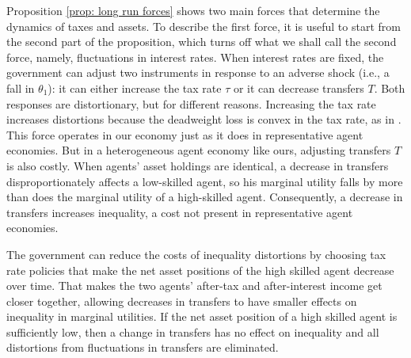 \documentclass[thmsb,11pt]{article}
\begin{document}
Proposition \ref{prop: long run forces}  shows  two main forces that determine the dynamics of taxes
and assets. To describe the first force, it is useful to start  from the second part
of the proposition, which turns off what we shall call the second force,  namely, fluctuations in
interest rates. When  interest rates are fixed, the government can adjust two
instruments in response  to an adverse  shock (i.e., a fall in $\theta_1$): it can either increase the  tax rate $%
\tau $ or it can decrease transfers $T.$ Both  responses are distortionary,
but for different reasons. Increasing the tax rate increases distortions because the deadweight loss is convex in the tax rate,
 as in \cite{Barro1979}. This force operates in our economy just as it does in  representative agent economies.
 But in a  heterogeneous agent economy like ours,  adjusting transfers $T$ is
also costly. When agents' asset holdings are identical, a decrease in transfers  disproportionately
affects a low-skilled agent, so his marginal utility
falls by more than does the marginal utility of a high-skilled agent. Consequently, a
decrease in transfers increases inequality, a cost  not present in  representative agent economies.

The government can reduce the costs of  inequality distortions by choosing
tax rate policies that make the net asset positions of  the high skilled agent
decrease over time. That makes the two agents'
after-tax and after-interest income  get closer
together, allowing decreases in transfers to have smaller effects on inequality in
marginal utilities. If the net asset position of a high skilled agent is
sufficiently low, then a change in transfers has no effect on inequality and
all  distortions from fluctuations in transfers are eliminated.



% 

\end{document}
